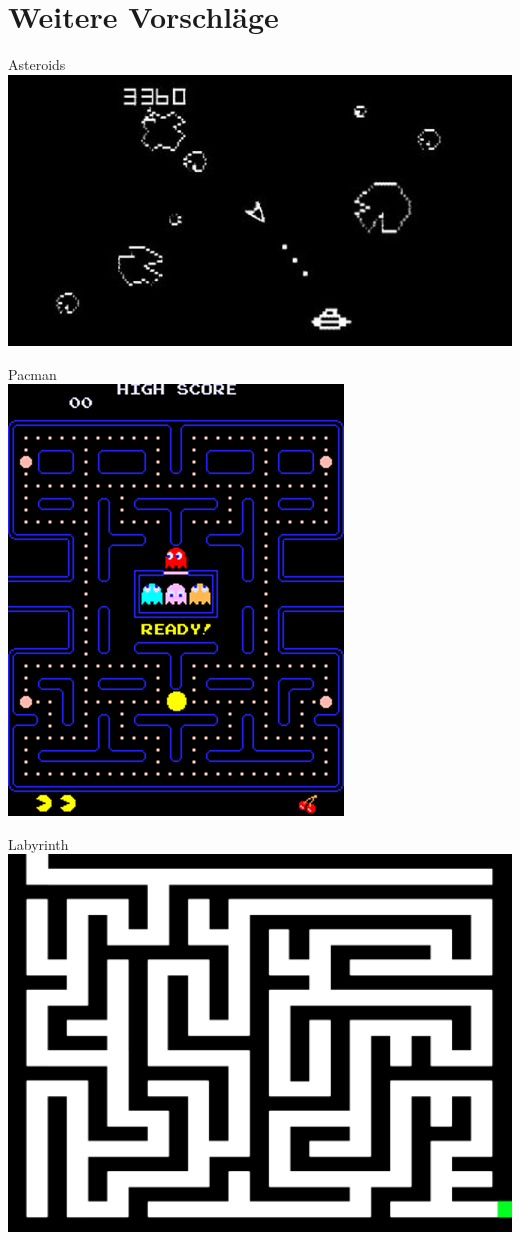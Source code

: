 \section*{Weitere Vorschläge}
\begin{minipage}{.45\textwidth}
    \begin{center}Asteroids\\\vspace{4ex} \includegraphics[width=.5\textwidth]{figures/img_asteroids.png}\end{center}
    \begin{center}Pacman\\\vspace{4ex}\includegraphics[width=.3\textwidth]{figures/img_pacman.png}\end{center}
    \begin{center}Labyrinth\\\vspace{4ex}\includegraphics[width=.4\textwidth]{figures/img_maze.png}\end{center}
\end{minipage}

